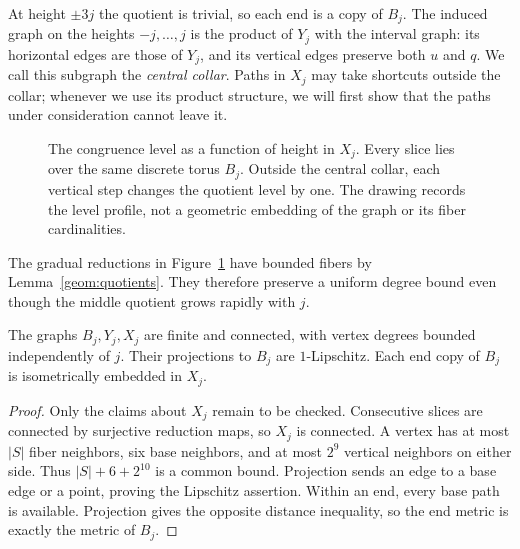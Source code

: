 At height $\pm3j$ the quotient is trivial, so each end is a copy of $B_j$.
The induced graph on the heights $-j,\ldots,j$ is the product of $Y_j$ with
the interval graph: its horizontal edges are those of $Y_j$, and its
vertical edges preserve both $u$ and $q$. We call this subgraph the
\emph{central collar}. Paths in $X_j$ may take shortcuts outside the
collar; whenever we use its product structure, we will first show that the
paths under consideration cannot leave it.

\begin{figure}[htbp]
\centering
{}
\caption{The congruence level as a function of height in $X_j$.
Every slice lies over the same discrete torus $B_j$. Outside the central
collar, each vertical step changes the quotient level by one. The drawing
records the level profile, not a geometric embedding of the graph or its
fiber cardinalities.}
\label{fig:profile}
\end{figure}

The gradual reductions in Figure~\ref{fig:profile} have bounded fibers by
Lemma~\ref{geom:quotients}. They therefore preserve a uniform degree bound
even though the middle quotient grows rapidly with $j$.

\begin{lemma}\label{geom:basic}
The graphs $B_j,Y_j,X_j$ are finite and connected, with vertex degrees bounded
independently of $j$. Their projections to $B_j$ are $1$-Lipschitz. Each end
copy of $B_j$ is isometrically embedded in $X_j$.
\end{lemma}

\begin{proof}
Only the claims about $X_j$ remain to be checked. Consecutive slices are
connected by surjective reduction maps, so $X_j$ is connected. A vertex has
at most $|S|$ fiber neighbors, six base neighbors, and at most $2^9$ vertical
neighbors on either side. Thus $|S|+6+2^{10}$ is a common bound. Projection
sends an edge to a base edge or a point, proving the Lipschitz assertion.
Within an end, every base path is available. Projection gives the opposite
distance inequality, so the end metric is exactly the metric of $B_j$.
\end{proof}

